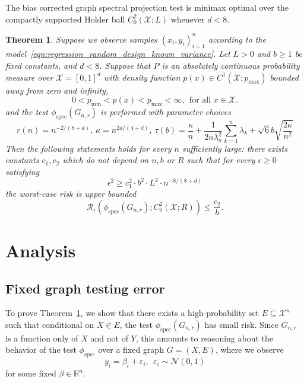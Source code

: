 \documentclass{article}
\newcommand{\Reals}{\mathbb{R}}
\newcommand{\1}{\mathbf{1}}
\newcommand{\Xset}{\mathcal{X}}
\newcommand{\spec}{\mathrm{spec}}
\theoremstyle{alden}
\theoremstyle{aldenthm}
\newtheorem{theorem}{Theorem}
\theoremstyle{definition}
\theoremstyle{remark}
\begin{document}
The bias corrected graph spectral projection test is minimax optimal over the compactly supported Holder ball $C_0^2(\Xset;L)$ whenever $d < 8$. 
\begin{theorem}
	\label{thm:holder_testing_rate_2}
	Suppose we observe samples $(x_i,y_i)_{i = 1}^{n}$ according to the model~\eqref{eqn:regression_random_design_known_variance}. Let $L > 0$ and $b \geq 1$ be fixed constants, and $d < 8$. Suppose that $P$ is an absolutely continuous probability measure over $\mathcal{X} = [0,1]^d$ with density function $p(x) \in C^1(\Xset;p_{\max})$ bounded away from zero and infinity, 
	\begin{equation*}
	0 < p_{\min} < p(x) < p_{\max} < \infty,~~ \textrm{for all $x \in \mathcal{X}$.}
	\end{equation*}
	and the test $\phi_{\spec}(G_{n,r})$ is performed with parameter choices
	\begin{equation*}
	r(n) = n^{-2/(8 + d)}, ~\kappa = n^{2d/(4 + d)}, ~\tau(b) = \frac{\kappa}{n} + \frac{1}{2n\lambda_{\kappa}^2}\sum_{k = 1}^{n}\lambda_k + \sqrt{6}b\sqrt{\frac{2\kappa}{n^2}}
	\end{equation*}
	Then the following statements holds for every $n$ sufficiently large: there exists constants $c_1,c_2$ which do not depend on $n,b$ or $R$ such that for every $\epsilon \geq 0$ satisfying
	\begin{equation}
	\label{eqn:sobolev_testing_rate_order1}
	\epsilon^2 \geq c_1^2 \cdot b^2 \cdot L^2 \cdot n^{-8/(8 + d)}
	\end{equation}
	the worst-case risk is upper bounded
	\begin{equation}
	\label{eqn:sobolev_testing_rate_order1_1}
	\mathcal{R}_{\epsilon}(\phi_{\mathrm{spec}}(G_{n,r}); C_0^2(\mathcal{X};R)) \leq \frac{c_2}{b}.
	\end{equation}
\end{theorem}

\section{Analysis}

\subsection{Fixed graph testing error}

To prove Theorem~\ref{thm:holder_testing_rate_2}, we show that there exists a high-probability set $E \subseteq \Xset^n$ such that conditional on $X \in E$, the test $\phi_{\spec}(G_{n,r})$ has small risk. Since $G_{n,r}$ is a function only of $X$ and not of $Y$, this amounts to reasoning about the behavior of the test $\phi_{\spec}$ over a fixed graph $G = (X,E)$, where we observe
\begin{equation}
\label{eqn:fixed_graph_regression_model}
y_i = \beta_i + \varepsilon_i,~~\varepsilon_i \sim \mathcal{N}(0,1)
\end{equation}
for some fixed $\beta \in \Reals^n$.  
\end{document}

